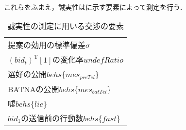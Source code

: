 これらをふまえ，誠実性はに示す要素によって測定を行う．

\begin{table}[b]
    \centering
    \caption{誠実性の測定に用いる交渉の要素}
    \begin{tabular}{l} \toprule
        提案の効用の標準偏差$\sigma$ \\
        $(bid_t)^{\mathrm{T}}[1]$の変化率$\mathit{undefRatio}$  \\
        選好の公開$behs\{mes_{\mathit{preTel}}\}$ \\
        BATNAの公開$behs\{mes_{\mathit{batTel}}\}$ \\
        嘘$behs\{lie\}$ \\ 
        $bid_1$の送信前の行動数$behs\{fast\}$ \\ \bottomrule
    \end{tabular}
    \label{tab:conscientiousness}
\end{table}

